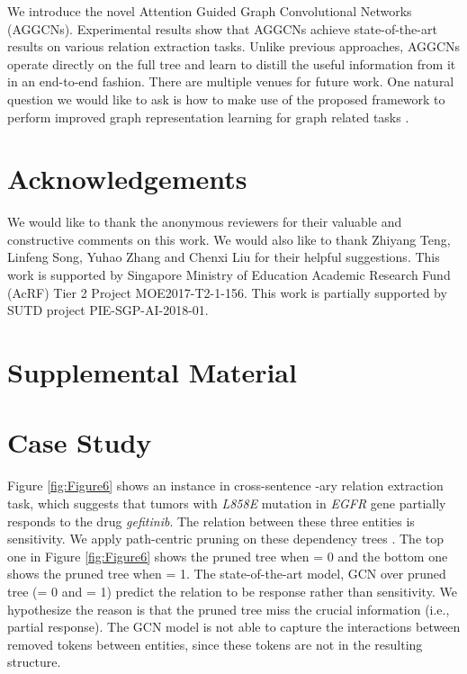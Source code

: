 \documentclass[11pt,a4paper]{article}
\begin{document}
We introduce the novel Attention Guided Graph Convolutional Networks (AGGCNs). Experimental results show that AGGCNs achieve state-of-the-art results on various relation extraction tasks. Unlike previous approaches, AGGCNs operate directly on the full tree and learn to distill the useful information from it in an end-to-end fashion. There are multiple venues for future work. One natural question we would like to ask is how to make use of the proposed framework to perform improved graph representation learning for graph related tasks \citep{Bastings2017GraphCE}.


\section*{Acknowledgements}

We would like to thank the anonymous reviewers for their valuable and constructive comments on this work. We would
also like to thank Zhiyang Teng, Linfeng Song, Yuhao Zhang and Chenxi Liu for their helpful suggestions. 
This work is supported by Singapore Ministry of Education Academic Research Fund (AcRF) Tier 2 Project MOE2017-T2-1-156. This work is partially supported by SUTD project PIE-SGP-AI-2018-01.




\appendix
\clearpage

\section*{Supplemental Material}

\section{Case Study}
\label{sec:6}

Figure \ref{fig:Figure6} shows an instance in cross-sentence -ary relation extraction task, which suggests that tumors with \textit{L858E} mutation in \textit{EGFR} gene partially responds to the drug \textit{gefitinib}. The relation between these three entities is sensitivity. We apply path-centric pruning on these dependency trees \citep{Zhang2018GraphCO}. The top one in Figure \ref{fig:Figure6} shows the pruned tree when = 0 and the bottom one shows the pruned tree when = 1. The state-of-the-art model, GCN over pruned tree (= 0 and = 1) \citep{Zhang2018GraphCO} predict the relation to be response rather than sensitivity. We hypothesize the reason is that the pruned tree miss the crucial information (i.e., partial response). The GCN model is not able to capture the interactions between removed tokens between entities, since these tokens are not in the resulting structure. 
\end{document}
